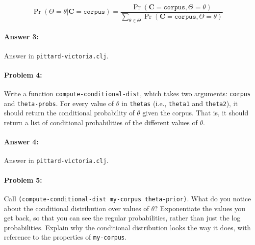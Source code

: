 \documentclass[10pt]{article}
\begin{document}
\begin{equation}
  \Pr(\Theta=\theta|\mathbf{C}=\texttt{corpus}) = \frac{\Pr(\mathbf{C}=\texttt{corpus},\Theta=\theta)}{\sum_{\theta \in \Theta} \Pr(\mathbf{C}=\texttt{corpus}, \Theta=\theta)}
\end{equation}

\paragraph{Answer 3:} Answer in \texttt{pittard-victoria.clj}.

\hrulefill
\paragraph{Problem 4:}

Write a function \texttt{compute-conditional-dist}, which takes two
arguments: \texttt{corpus} and \texttt{theta-probs}. For every value
of $\theta$ in \texttt{thetas} (i.e., \texttt{theta1} and
\texttt{theta2}), it should return the conditional probability of
$\theta$ given the corpus. That is, it should return a list of
conditional probabilities of the different values of $\theta$.

\paragraph{Answer 4:} Answer in
\texttt{pittard-victoria.clj}.

\hrulefill
\paragraph{Problem 5:}
 
Call \texttt{(compute-conditional-dist my-corpus theta-prior)}. What
do you notice about the conditional distribution over values of
$\theta$?  Exponentiate the values you get back, so that you can see
the regular probabilities, rather than just the log
probabilities. Explain why the conditional distribution looks the way
it does, with reference to the properties of \texttt{my-corpus}.
\end{document}
